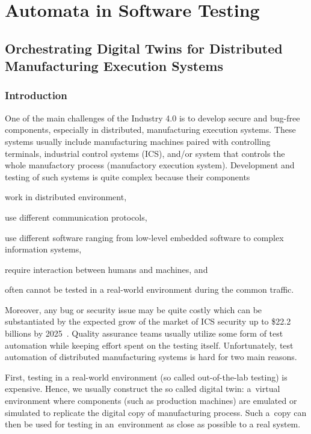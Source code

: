 {\part{Automata in Software Testing}

\chapter{Orchestrating Digital Twins for Distributed Manufacturing Execution Systems}
\label{ch:eurocast}
\section{Introduction}

One of the main challenges of the Industry 4.0 is to develop secure and
bug-free components, especially in distributed, manufacturing execution
systems. These systems usually include manufacturing machines paired with
controlling terminals, industrial control systems (ICS), and/or system that
controls the whole manufactory process (manufactory execution system).
Development and testing of such systems is quite complex because their
components
%
\begin{inparaenum}[(1)]
%
 \item work in distributed environment,
%
 \item use different communication protocols, 
%
 \item use different software ranging from low-level embedded software to
 complex information systems, 
%
 \item require interaction between humans and machines, and
%
 \item often cannot be tested in a real-world environment during the common
 traffic.
%
\end{inparaenum}

Moreover, any bug or security issue may be quite costly which can be
substantiated by the expected grow of the market of ICS security up to \$22.2
billions by 2025~\cite{ref_market}.
%
Quality assurance teams usually utilize some form of test automation 
while keeping effort spent on the testing itself.  Unfortunately, test
automation of distributed manufacturing systems is hard for two main reasons.


First, testing in a real-world environment (so called out-of-the-lab testing)
is expensive.  Hence, we usually construct the so called digital twin:
a~virtual environment where components (such as production machines) are
emulated or simulated to replicate the digital copy of manufacturing process.  
%
Such a~copy can then be used for testing in an~environment as close as possible
to a real system.

}
